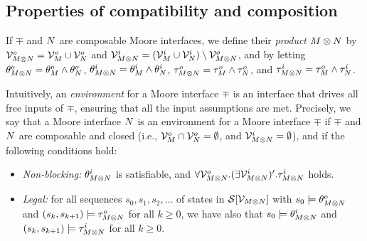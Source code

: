 \subsection{Properties of compatibility and composition} 

If $\mp$ and $N$ are composable Moore interfaces, we define their
{\em product\/} $M\otimes N$ by 
${\cal V}^o_{M\otimes N} = {\cal V}^o_M \cup {\cal V}^o_N$ and
${\cal V}^i_{M\otimes N} = 
	({\cal V}^i_M \cup {\cal V}^i_N) \setminus {\cal V}^o_{M\otimes N}$, 
and by letting 
$\theta^o_{M\otimes N} = \theta^o_M \wedge \theta^o_N$, 
$\theta^i_{M\otimes N} = \theta^i_M \wedge \theta^i_N$, 
$\tau^o_{M\otimes N} = \tau^o_M \wedge \tau^o_N$, and 
$\tau^i_{M\otimes N} = \tau^o_M \wedge \tau^i_N$.
\begin{comment} 
Intuitively, an environment for a Moore interface $\mp$ is an
interface that drives all free inputs of $\mp$, ensuring that all the
input assumptions are met. 
Precisely, we say that a Moore interface $\mq$ is an 
{\em environment\/} for a Moore interface $\mp$ if 
(i)~$\mp$ and $\mq$ are composable;
(ii)~$\mp\prod\mq$ is closed i.e., $\ivars_{\mp\oprod\mq} =
\emptyset$; 
(iii)~$\mp\prod\mq$ is non-blocking, i.e., $\iinit_{\mp\oprod\mq}$ is
satisfiable, and $\forall \ovars_{\mp\oprod\mq} . (\exists
\ivars_{\mp\oprod\mq})' . \itrans_{\mp\oprod\mq}$ holds; and 
(iv)~for all sequences $s_0, s_1, s_2, \ldots$ of
states in $\states[\vars_{\mp\oprod\mq}]$ with $s_0 \sat
\oinit_{\mp\oprod\mq}$ and $(s_k,s_{k+1}) \sat \otrans_{\mp\oprod\mq}$
for all $k \geq 0$, we have also that $s_0 \sat \iinit_{\mp\oprod\mq}$
and $(s_k,s_{k+1}) \sat \itrans_{\mp\oprod\mq}$ for all $k \geq 0$.
\end{comment}
%
Intuitively, an {\em environment\/} for a Moore interface $\mp$ is an
interface that drives all free inputs of $\mp$, ensuring that all the
input assumptions are met. 
Precisely, we say that a Moore interface $N$ is an 
environment for a Moore interface $\mp$ if $\mp$ and $N$ are
composable and closed (i.e., ${\cal V}^o_M \cap {\cal V}^o_N =
\emptyset$, and ${\cal V}^i_{M\otimes N} = \emptyset$), and if the
following conditions hold:  


\begin{itemize}
\item {\em Non-blocking:\/} $\theta^i_{M\otimes N}$ is satisfiable,
and $\forall {\cal V}^o_{M\otimes N} . (\exists {\cal V}^i_{M\otimes N})'
. \tau^i_{M\otimes N}$ holds. 
\item {\em Legal:\/} for all sequences $s_0, s_1, s_2, \ldots$ of
states in ${\cal S}[{\cal V}_{M\otimes N}]$ with $s_0 \models
\theta^o_{M\otimes N}$ and $(s_k,s_{k+1}) \models \tau^o_{M\otimes N}$
for all $k \geq 0$, we have also that $s_0 \models \theta^i_{M\otimes N}$
and $(s_k,s_{k+1}) \models \tau^i_{M\otimes N}$ for all $k \geq 0$.
\end{itemize}

